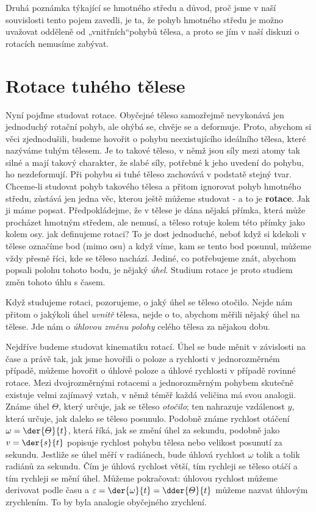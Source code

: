     Druhá poznámka týkající se hmotného středu a důvod, proč jsme v naší souvislosti tento pojem
    zavedli, je ta, že pohyb hmotného středu je možno uvažovat odděleně od „vnitřních“pohybů tělesa,
    a proto se jím v naší diskuzi o rotacích nemusíme zabývat.
  
  \section{Rotace tuhého tělese}\label{fyz:IchapXVIIIsecII}
    Nyní pojďme studovat rotace. Obyčejné těleso samozřejmě nevykonává jen jednoduchý rotační pohyb,
    ale ohýbá se, chvěje se a deformuje. Proto, abychom si věci zjednodušili, budeme hovořit o
    pohybu neexistujícího ideálního tělesa, které nazýváme tuhým tělesem. Je to takové těleso, v
    němž jsou síly mezi atomy tak silné a mají takový charakter, že slabé síly, potřebné k jeho
    uvedení do pohybu, ho nezdeformují. Při pohybu si tuhé těleso zachovává v podstatě stejný tvar.
    Chceme-li studovat pohyb takového tělesa a přitom ignorovat pohyb hmotného středu, zůstává jen
    jedna věc, kterou ještě můžeme studovat - a to je \textbf{rotace}. Jak ji máme popsat.
    Předpokládejme, že v tělese je dána nějaká přímka, která může procházet hmotným středem, ale
    nemusí, a těleso rotuje kolem této přímky jako kolem osy. jak definujeme rotaci? To je dost
    jednoduché, neboť když si kdekoli v tělese označíme bod (mimo osu) a když víme, kam se tento bod
    posunul, můžeme vždy přesně říci, kde se těleso nachází. Jediné, co potřebujeme znát, abychom
    popsali polohu tohoto bodu, je nějaký \emph{úhel}. Studium rotace je proto studiem změn tohoto
    úhlu s časem.

    Když studujeme rotaci, pozorujeme, o jaký úhel se těleso otočilo. Nejde nám přitom o jakýkoli
    úhel \emph{uvnitř} tělesa, nejde o to, abychom měřili nějaký úhel na tělese. Jde nám o
    \emph{úhlovou změnu polohy} celého tělesa za nějakou dobu.

    Nejdříve budeme studovat kinematiku rotací. Úhel se bude měnit v závislosti na čase a právě tak,
    jak jsme hovořili o poloze a rychlosti v jednorozměrném případě, můžeme hovořit o úhlové poloze
    a úhlové rychlosti v případě rovinné rotace. Mezi dvojrozměrnými rotacemi a jednorozměrným
    pohybem skutečně existuje velmi zajímavý vztah, v němž téměř každá veličina má svou analogii.
    Známe úhel \(\varTheta\), který určuje, jak se těleso \emph{otočilo}; ten nahrazuje vzdálenost
    \(y\), která určuje, jak daleko se těleso posunulo. Podobně známe rychlost otáčení \(\omega=
    \der{\varTheta}{t}\), která říká, jak se změní úhel za sekundu, podobně jako \(v = \der{s}{t}\)
    popisuje rychlost pohybu tělesa nebo velikost posunutí za sekundu. Jestliže se úhel měří v
    radiánech, bude úhlová rychlost \(\omega\) tolik a tolik radiánů za sekundu. Čím je úhlová
    rychlost větší, tím rychleji se těleso otáčí a tím rychleji se mění úhel. Můžeme pokračovat:
    úhlovou rychlost můžeme derivovat podle času a \(\varepsilon = \der{\omega}{t} =
    \dder{\varTheta}{t}\) můžeme nazvat úhlovým zrychlením. To by byla analogie obyčejného
    zrychlení.

